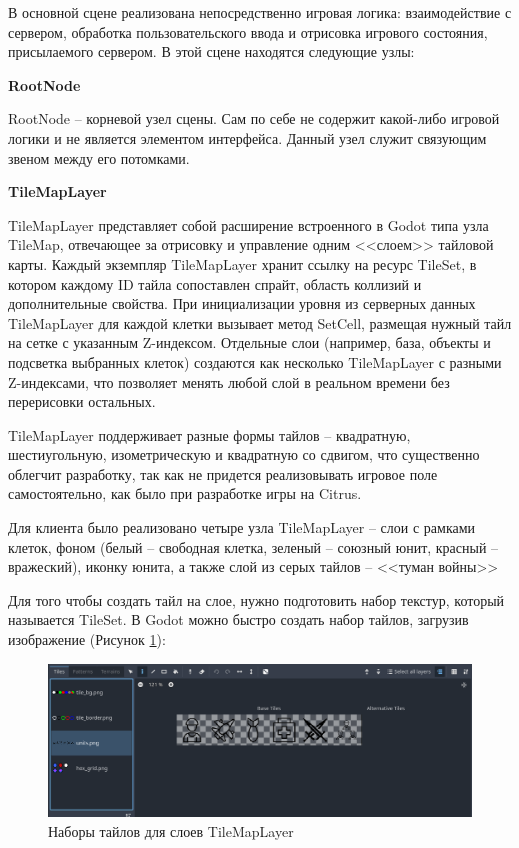             В основной сцене реализована непосредственно игровая логика: взаимодействие с сервером, обработка пользовательского ввода и отрисовка игрового состояния,
            присылаемого сервером. В этой сцене находятся следующие узлы:

            \textbf{RootNode}

            RootNode -- корневой узел сцены. Сам по себе не содержит какой-либо игровой логики и не является элементом интерфейса. Данный узел служит связующим звеном между его потомками. 
            
            \textbf{TileMapLayer}

            TileMapLayer представляет собой расширение встроенного в Godot типа узла TileMap, отвечающее за отрисовку и управление одним <<слоем>> тайловой карты. Каждый экземпляр TileMapLayer 
            хранит ссылку на ресурс TileSet, в котором каждому ID тайла сопоставлен спрайт, область коллизий и дополнительные свойства. При инициализации уровня из серверных 
            данных TileMapLayer для каждой клетки вызывает метод SetCell, размещая нужный тайл на сетке с указанным Z-индексом. 
            Отдельные слои (например, база, объекты и подсветка выбранных клеток) создаются как несколько TileMapLayer с разными Z-индексами, что позволяет менять любой слой в 
            реальном времени без перерисовки остальных.

            TileMapLayer поддерживает разные формы тайлов -- квадратную, шестиугольную, изометрическую и квадратную со сдвигом, что существенно облегчит разработку, так как не придется
            реализовывать игровое поле самостоятельно, как было при разработке игры на Citrus.

            Для клиента было реализовано четыре узла TileMapLayer -- слои с рамками клеток, фоном (белый -- свободная клетка, зеленый -- союзный юнит, красный -- вражеский), 
            иконку юнита, а также слой из серых тайлов -- <<туман войны>>

            Для того чтобы создать тайл на слое, нужно подготовить набор текстур, который называется TileSet. В Godot можно быстро создать набор тайлов, загрузив изображение (Рисунок \ref{ris2.4}):
            \begin{figure}[H]
                \centering
                \includegraphics[width=\textwidth]{pictures/godot_tileset.png}
                \caption{Наборы тайлов для слоев TileMapLayer}\label{ris2.4}
            \end{figure}

